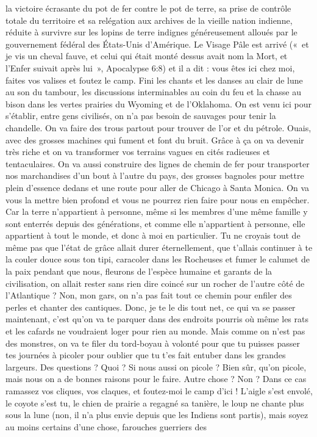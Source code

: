 la victoire écrasante du pot de fer contre le pot de terre, sa prise de contrôle totale du territoire et sa relégation aux archives de la vieille nation indienne, réduite à survivre sur les lopins de terre indignes généreusement alloués par le gouvernement fédéral des États-Unis d’Amérique. Le Visage Pâle est arrivé («~et je vis un cheval fauve, et celui qui était monté dessus avait nom la Mort, et l’Enfer suivait après lui~», Apocalypse 6:8) et il a dit : vous êtes ici chez moi, faites vos valises et foutez le camp. Fini les chants et les danses au clair de lune au son du tambour, les discussions interminables au coin du feu et la chasse au bison dans les vertes prairies du Wyoming et de l’Oklahoma. On est venu ici pour s’établir, entre gens civilisés, on n’a pas besoin de sauvages pour tenir la chandelle. On va faire des trous partout pour trouver de l’or et du pétrole. Ouais, avec des grosses machines qui fument et font du bruit. Grâce à ça on va devenir très riche et on va transformer vos terrains vagues en cités radieuses et tentaculaires. On va aussi construire des lignes de chemin de fer pour transporter nos marchandises d’un bout à l’autre du pays, des grosses bagnoles pour mettre plein d’essence dedans et une route pour aller de Chicago à Santa Monica. On va vous la mettre bien profond et vous ne pourrez rien faire pour nous en empêcher. Car la terre n’appartient à personne, même si les membres d’une même famille y sont enterrés depuis des générations, et comme elle n’appartient à personne, elle appartient à tout le monde, et donc à moi en particulier. Tu ne croyais tout de même pas que l’état de grâce allait durer éternellement, que t’allais continuer à te la couler douce sous ton tipi, caracoler dans les Rocheuses et fumer le calumet de la paix pendant que nous, fleurons de l’espèce humaine et garants de la civilisation, on allait rester sans rien dire coincé sur un rocher de l’autre côté de l’Atlantique ? Non, mon gars, on n’a pas fait tout ce chemin pour enfiler des perles et chanter des cantiques. Donc, je te le dis tout net, ce qui va se passer maintenant, c’est qu’on va te parquer dans des endroits pourris où même les rats et les cafards ne voudraient loger pour rien au monde. Mais comme on n’est pas des monstres, on va te filer du tord-boyau à volonté pour que tu puisses passer tes journées à picoler pour oublier que tu t’es fait entuber dans les grandes largeurs. Des questions ? Quoi ? Si nous aussi on picole ? Bien sûr, qu’on picole, mais nous on a de bonnes raisons pour le faire. Autre chose ? Non ? Dans ce cas ramassez vos cliques, vos claques, et foutez-moi le camp d’ici ! L’aigle s’est envolé, le coyote s’est tu, le chien de prairie a regagné sa tanière, le loup ne chante plus sous la lune (non, il n’a plus envie depuis que les Indiens sont partis), mais soyez au moins certains d’une chose, farouches guerriers des 